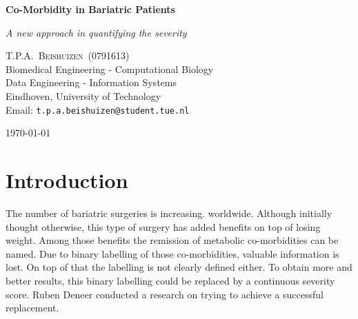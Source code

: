 \documentclass[10pt,a4paper]{article}
\newcommand{\documenttitle}{Co-Morbidity in Bariatric Patients}
\newcommand{\documentsubtitle}{A new approach in quantifying the severity}
\begin{document}
	
	\begin{titlepage}
		
		\center
		
		\vspace*{3cm}
		
		\textbf{\huge \documenttitle}
		
		\textit{\LARGE \documentsubtitle}
		
		\vspace*{2cm}
		
		\large
		\centering
		T.P.A.~\textsc{Beishuizen}~(0791613)\\
		Biomedical Engineering - Computational Biology\\
		Data Engineering - Information Systems\\
		Eindhoven, University of Technology\\
		Email: \texttt{t.p.a.beishuizen@student.tue.nl}
		
		\vfill
		
		\vspace*{1cm}
		
		\today
		
	\end{titlepage}
	
	\tableofcontents
	
	
	\pagestyle{fancy}
	\fancyhead{} %
	\fancyfoot{} %
	\renewcommand{\headrulewidth}{0.4pt}
	\renewcommand{\footrulewidth}{0.4pt}
	
	\fancyhead[L]{\rightmark}
	\fancyfoot[C]{\thepage}
		
	\clearpage
	
	\section{Introduction}
	\label{sec:Intro}
	
	The number of bariatric surgeries is increasing. worldwide. Although initially thought otherwise, this type of surgery has added benefits on top of losing weight. Among those benefits the remission of metabolic co-morbidities can be named. Due to binary labelling of those co-morbidities, valuable information is lost. On top of that the labelling is not clearly defined either. To obtain more and better results, this binary labelling could be replaced by a continuous severity score. Ruben Deneer conducted a research on trying to achieve a successful replacement.
	
\end{document}
